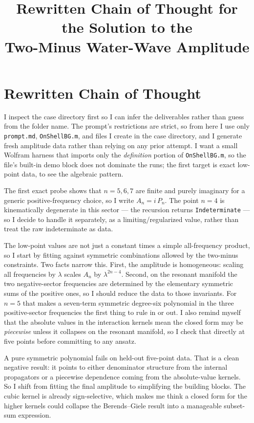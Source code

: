 \documentclass{article}
\title{Rewritten Chain of Thought for the Solution to the\\
Two-Minus Water-Wave Amplitude}
\author{}
\date{}
\begin{document}
\maketitle


\section*{Rewritten Chain of Thought}

I inspect the case directory first so I can infer the deliverables rather than
guess from the folder name. The prompt's restrictions are strict, so from here I
use only \texttt{prompt.md}, \texttt{OnShellBG.m}, and files I create in the case
directory, and I generate fresh amplitude data rather than relying on any prior
attempt. I want a small Wolfram harness that imports only the \emph{definition}
portion of \texttt{OnShellBG.m}, so the file's built-in demo block does not
dominate the runs; the first target is exact low-point data, to see the algebraic
pattern.

The first exact probe shows that $n=5,6,7$ are finite and purely imaginary for a
generic positive-frequency choice, so I write $A_n=i\,P_n$. The point $n=4$ is
kinematically degenerate in this sector --- the recursion returns
\texttt{Indeterminate} --- so I decide to handle it separately, as a
limiting/regularized value, rather than treat the raw indeterminate as data.

The low-point values are not just a constant times a simple all-frequency
product, so I start by fitting against symmetric combinations allowed by the
two-minus constraints. Two facts narrow this. First, the amplitude is
homogeneous: scaling all frequencies by $\lambda$ scales $A_n$ by
$\lambda^{2n-4}$. Second, on the resonant manifold the two negative-sector
frequencies are determined by the elementary symmetric sums of the positive
ones, so I should reduce the data to those invariants. For $n=5$ that makes a
seven-term symmetric degree-six polynomial in the three positive-sector
frequencies the first thing to rule in or out. I also remind myself that the
absolute values in the interaction kernels mean the closed form may be
\emph{piecewise} unless it collapses on the resonant manifold, so I check that
directly at five points before committing to any ansatz.

A pure symmetric polynomial fails on held-out five-point data. That is a clean
negative result: it points to either denominator structure from the internal
propagators or a piecewise dependence coming from the absolute-value kernels. So
I shift from fitting the final amplitude to simplifying the building blocks. The
cubic kernel is already sign-selective, which makes me think a closed form for
the higher kernels could collapse the Berends--Giele result into a manageable
subset-sum expression.
\end{document}
